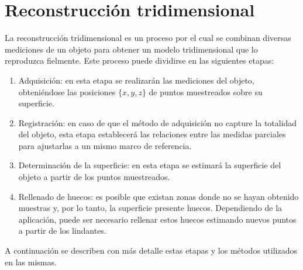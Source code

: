 \chapter{Reconstrucción tridimensional}

La reconstrucción tridimensional es un proceso por el cual se combinan diversas mediciones de un objeto
para obtener un modelo tridimensional que lo reproduzca fielmente.
Este proceso puede dividirse en las siguientes etapas:
\begin{enumerate}
	\item Adquisición: en esta etapa se realizarán las mediciones del objeto,
		obteniéndose las posiciones $\{x, y, z\}$ de puntos muestreados sobre su superficie.
	\item Registración: en caso de que el método de adquisición no capture la totalidad del objeto,
		esta etapa establecerá las relaciones entre las medidas parciales
		para ajustarlas a un mismo marco de referencia.
	\item Determinación de la superficie: en esta etapa se estimará la superficie del objeto
		a partir de los puntos muestreados.
	\item Rellenado de huecos: es posible que existan zonas donde
		no se hayan obtenido muestras y, por lo tanto, la superficie presente huecos.
		Dependiendo de la aplicación, puede ser necesario rellenar estos huecos
		estimando nuevos puntos a partir de los lindantes.
\end{enumerate}

A continuación se describen con más detalle estas etapas y los métodos utilizados en las mismas.






